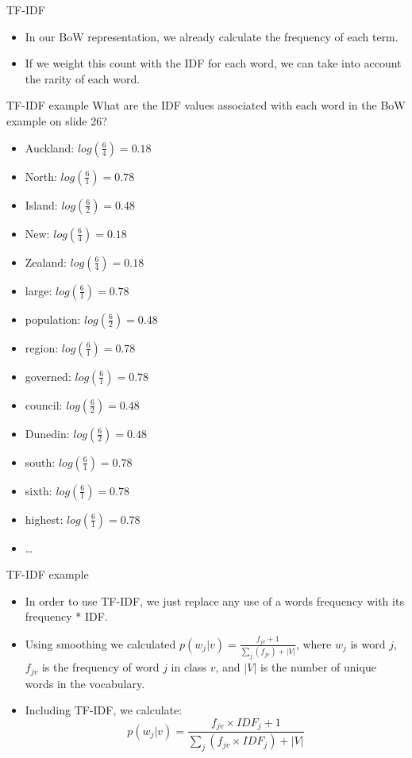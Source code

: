 \documentclass[aspectratio=169, 10pt]{beamer}
\begin{document}
\begin{frame}{TF-IDF}
    \begin{itemize}
        \item In our BoW representation, we already calculate the frequency of each term.
        \item If we weight this count with the IDF for each word, we can take into account the rarity of each word.
    \end{itemize}
\end{frame}

\begin{frame}{TF-IDF example}
What are the IDF values associated with each word in the BoW example on slide 26?
\pause
    \begin{itemize}
        \item Auckland: $log(\frac{6}{4}) = 0.18$
        \item North: $log(\frac{6}{1}) = 0.78$
        \item Island: $log(\frac{6}{2}) = 0.48$
        \item New: $log(\frac{6}{4}) = 0.18$
        \item Zealand: $log(\frac{6}{4}) = 0.18$
        \item large: $log(\frac{6}{1}) = 0.78$
        \item population: $log(\frac{6}{2}) = 0.48$
        \item region: $log(\frac{6}{1}) = 0.78$
        \item governed: $log(\frac{6}{1}) = 0.78$
        \item council: $log(\frac{6}{2}) = 0.48$
        \item Dunedin: $log(\frac{6}{2}) = 0.48$
        \item south: $log(\frac{6}{1}) = 0.78$
        \item sixth: $log(\frac{6}{1}) = 0.78$
        \item highest: $log(\frac{6}{1}) = 0.78$
        \item \dots
    \end{itemize}
\end{frame}

\begin{frame}{TF-IDF example}
\begin{itemize}
    \item In order to use TF-IDF, we just replace any use of a words frequency with its frequency * IDF.
    \item Using smoothing we calculated $p(w_j|v) = \frac{f_{jv} + 1}{\sum_j(f_{jv}) +|V|}$, where $w_j$ is word $j$, $f_{jv}$ is the frequency of word $j$ in class $v$, and $|V|$ is the number of unique words in the vocabulary.
    \item Including TF-IDF, we calculate: $$
        p(w_j|v) = \frac{f_{jv}\times IDF_j + 1}{\sum_j(f_{jv}\times IDF_j) +|V|}
    $$
\end{itemize}
\end{frame}
\end{document}
